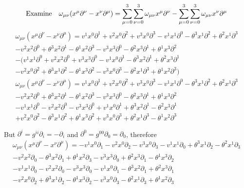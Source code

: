 \documentclass{article}
\begin{document}
\[\qq*{Examine}\omega_{\mu\nu} (x^\mu \partial^\nu-x^\nu \partial^\mu)=\sum^3_{\mu=0}\sum^3_{\nu=0}\omega_{\mu\nu} x^\mu \partial^\nu-\sum^3_{\mu=0}\sum^3_{\nu=0}\omega_{\mu\nu} x^\nu \partial^\mu\]
\begin{multline*}
	\omega_{\mu\nu} (x^\mu \partial^\nu-x^\nu \partial^\mu)=
	v^1 x^0 \partial^1+v^2 x^0 \partial^2+v^3 x^0 \partial^3
	-v^1 x^1 \partial^0-\theta^3 x^1 \partial^2+\theta^2 x^1 \partial^3\\ 
	-v^2 x^2 \partial^0+\theta^3 x^2 \partial^1-\theta^1 x^2 \partial^3
	-v^3 x^3 \partial^0-\theta^2 x^3 \partial^1+\theta^1 x^3 \partial^2\\-
	(v^1 x^1 \partial^0+v^2 x^2 \partial^0+v^3 x^3 \partial^0
	-v^1 x^0 \partial^1-\theta^3 x^2 \partial^1+\theta^2 x^3 \partial^1\\ 
	-v^2 x^0 \partial^2+\theta^3 x^1 \partial^2-\theta^1 x^3 \partial^2
	-v^3 x^0 \partial^3-\theta^2 x^1 \partial^3+\theta^1 x^2 \partial^3)\end{multline*}
\begin{multline*}
	\omega_{\mu\nu} (x^\mu \partial^\nu-x^\nu \partial^\mu)=
	v^1 x^0 \partial^1+v^2 x^0 \partial^2+v^3 x^0 \partial^3
	-v^1 x^1 \partial^0-\theta^3 x^1 \partial^2+\theta^2 x^1 \partial^3\\ 
	-v^2 x^2 \partial^0+\theta^3 x^2 \partial^1-\theta^1 x^2 \partial^3
	-v^3 x^3 \partial^0-\theta^2 x^3 \partial^1+\theta^1 x^3 \partial^2\\
	-v^1 x^1 \partial^0-v^2 x^2 \partial^0-v^3 x^3 \partial^0
	+v^1 x^0 \partial^1+\theta^3 x^2 \partial^1-\theta^2 x^3 \partial^1\\ 
	+v^2 x^0 \partial^2-\theta^3 x^1 \partial^2+\theta^1 x^3 \partial^2
	+v^3 x^0 \partial^3+\theta^2 x^1 \partial^3-\theta^1 x^2 \partial^3\end{multline*}

But $\partial^i=g^{ii}\partial_i=-\partial_i$ and $\partial^0=g^{00}\partial_0=\partial_0$, therefore
\begin{multline*}
	\omega_{\mu\nu} (x^\mu \partial^\nu-x^\nu \partial^\mu)=
	-v^1 x^0 \partial_1-v^2 x^0 \partial_2-v^3 x^0 \partial_3
	-v^1 x^1 \partial_0+\theta^3 x^1 \partial_2-\theta^2 x^1 \partial_3\\ 
	-v^2 x^2 \partial_0-\theta^3 x^2 \partial_1+\theta^1 x^2 \partial_3
	-v^3 x^3 \partial_0+\theta^2 x^3 \partial_1-\theta^1 x^3 \partial_2\\
	-v^1 x^1 \partial_0-v^2 x^2 \partial_0-v^3 x^3 \partial_0
	-v^1 x^0 \partial_1-\theta^3 x^2 \partial_1+\theta^2 x^3 \partial_1\\ 
	-v^2 x^0 \partial_2+\theta^3 x^1 \partial_2-\theta^1 x^3 \partial_2
	-v^3 x^0 \partial_3-\theta^2 x^1 \partial_3+\theta^1 x^2 \partial_3\end{multline*}
\end{document}
